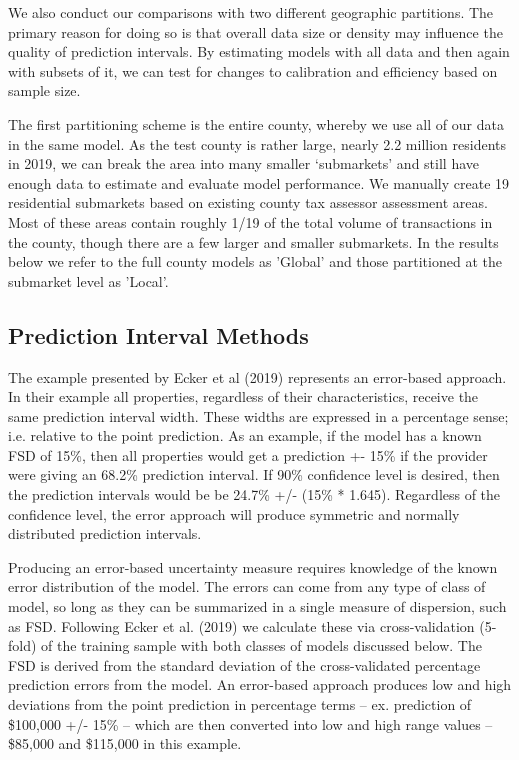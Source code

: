 \documentclass[colTwo]{anon}
\theoremstyle{definition}
\begin{document}
We also conduct our comparisons with two different geographic partitions.  The primary reason for doing so is that overall data size or density may influence the quality of prediction intervals.  By estimating models with all data and then again with subsets of it, we can test for changes to calibration and efficiency based on sample size.  

The first partitioning scheme is the entire county, whereby we use all of our data in the same model.  As the test county is rather large, nearly 2.2 million residents in 2019, we can break the area into many smaller ‘submarkets’ and still have enough data to estimate and evaluate model performance.  We manually create 19 residential submarkets based on existing county tax assessor assessment areas.  Most of these areas contain roughly 1/19 of the total volume of transactions in the county, though there are a few larger and smaller submarkets. In the results below we refer to the full county models as 'Global' and those partitioned at the submarket level as 'Local'. 
 
\subsection{Prediction Interval Methods}

The example presented by Ecker et al (2019) represents an error-based approach. In their example all properties, regardless of their characteristics, receive the same prediction interval width.  These widths are expressed in a percentage sense; i.e. relative to the point prediction. As an example,  if the model has a known FSD of 15\%, then all properties would get a prediction +- 15\% if the provider were giving an 68.2\% prediction interval.  If 90\% confidence level is desired, then the prediction intervals would be be 24.7\% +/- (15\% * 1.645).  Regardless of the confidence level, the error approach will produce symmetric and normally distributed prediction intervals. 

Producing an error-based uncertainty measure requires knowledge of the known error distribution of the model. The errors can come from any type of class of model, so long as they can be summarized in a single measure of dispersion, such as FSD. Following Ecker et al. (2019) we calculate these via cross-validation (5-fold) of the training sample with both classes of models discussed below. The FSD is derived from the standard deviation of the cross-validated percentage prediction errors from the model. An error-based approach produces low and high deviations from the point prediction in percentage terms -- ex. prediction of \$100,000 +/- 15\% -- which are then converted into low and high range values -- \$85,000 and \$115,000 in this example. 
\end{document}

